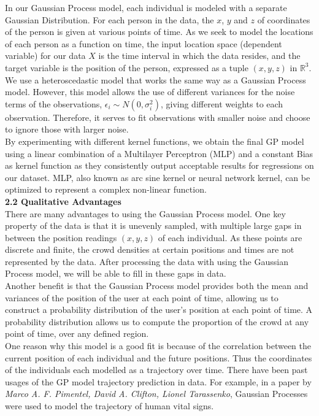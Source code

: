 \documentclass[letterpaper]{article}
\begin{document}
In our Gaussian Process model, each individual is modeled with a separate Gaussian Distribution. For each person in the data, the $x$, $y$ and $z$ of coordinates of the person is given at various points of time. As we seek to model the locations of each person as a function on time, the input location space (dependent variable) for our data $X$ is the time interval in which the data resides, and the target variable is the position of the person, expressed as a tuple $(x,y,z)$ in $\mathbb{R}^3$. \\

We use a heteroscedastic model that works the same way as a Gaussian Process model. However, this model allows the use of different variances for the noise terms of the observations, $\epsilon_i \sim N(0, \sigma_i^2)$, giving different weights to each observation. Therefore, it serves to fit observations with smaller noise and choose to ignore those with larger noise. \\

By experimenting with different kernel functions, we obtain the final GP model using a linear combination of a Multilayer Perceptron (MLP) and a constant Bias as kernel function as they consistently output acceptable results for regressions on our dataset. MLP, also known as arc sine kernel or neural network kernel, can be optimized to represent a complex non-linear function. \\

{\bf2.2  Qualitative Advantages} \\

There are many advantages to using the Gaussian Process model. One key property of the data is that it is unevenly sampled, with multiple large gaps in between the position readings $(x,y,z)$ of each individual. As these points are discrete and finite, the crowd densities at certain positions and times are not represented by the data. After processing the data with using the Gaussian Process model, we will be able to fill in these gaps in data. \\

Another benefit is that the Gaussian Process model provides both the mean and variances of the position of the user at each point of time, allowing us to construct a probability distribution of the user's position at each point of time. A probability distribution allows us to compute the proportion of the crowd at any point of time, over any defined region. \\

One reason why this model is a good fit is because of the correlation between the current position of each individual and the future positions. Thus the coordinates of the individuals each modelled as a trajectory over time. There have been past usages of the GP model trajectory prediction in data. For example, in a paper by {\it Marco A. F. Pimentel, David A. Clifton, Lionel Tarassenko}, Gaussian Processes were used to model the trajectory of human vital signs. \\
\end{document}

